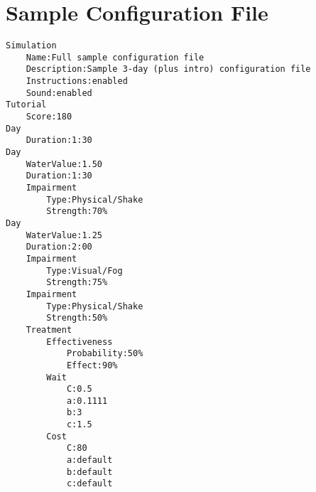 \documentclass{article}
\begin{document}

 
%    
    
\pagebreak\section*{Sample Configuration File}
\begin{lstlisting}
Simulation
    Name:Full sample configuration file
    Description:Sample 3-day (plus intro) configuration file  
    Instructions:enabled
    Sound:enabled
Tutorial
    Score:180
Day
    Duration:1:30
Day
    WaterValue:1.50
    Duration:1:30
    Impairment
        Type:Physical/Shake
        Strength:70%
Day
    WaterValue:1.25
    Duration:2:00
    Impairment
        Type:Visual/Fog
        Strength:75%
    Impairment
        Type:Physical/Shake
        Strength:50%
    Treatment
        Effectiveness
            Probability:50%
            Effect:90%
        Wait
            C:0.5
            a:0.1111
            b:3
            c:1.5
        Cost
            C:80
            a:default
            b:default
            c:default
\end{lstlisting}    
\end{document}
